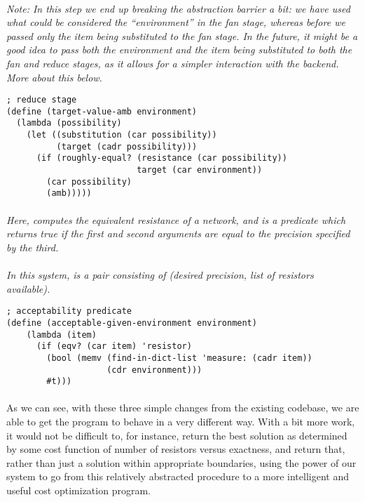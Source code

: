 \paragraph{}
\textit{Note: In this step we end up breaking the abstraction barrier a bit: we have used what could be considered the ``environment'' in the fan stage, whereas before we passed only the item being substituted to the fan stage. In the future, it might be a good idea to pass both the environment and the item being substituted to both the fan and reduce stages, as it allows for a simpler interaction with the backend. More about this below.}
\newpage
\begin{verbatim}
; reduce stage
(define (target-value-amb environment)
  (lambda (possibility)
    (let ((substitution (car possibility))
          (target (cadr possibility)))
      (if (roughly-equal? (resistance (car possibility))
                          target (car environment))
        (car possibility)
        (amb)))))
\end{verbatim}
\paragraph{}
\textit{Here,  computes the equivalent resistance of a network, and  is a predicate which returns true if the first and second arguments are equal to the precision specified by the third.}

\paragraph{}
\textit{In this system,  is a pair consisting of (desired precision, list of resistors available).}


\begin{verbatim}
; acceptability predicate
(define (acceptable-given-environment environment)
    (lambda (item)
      (if (eqv? (car item) 'resistor)
        (bool (memv (find-in-dict-list 'measure: (cadr item))
                    (cdr environment)))
        #t)))
\end{verbatim}

\paragraph{}
As we can see, with these three simple changes from the existing codebase, we are able to get the program to behave in a very different way. With a bit more work, it would not be difficult to, for instance, return the best solution as determined by some cost function of number of resistors versus exactness, and return that, rather than just a solution within appropriate boundaries, using the power of our system to go from this relatively abstracted  procedure to a more intelligent and useful cost optimization program.

